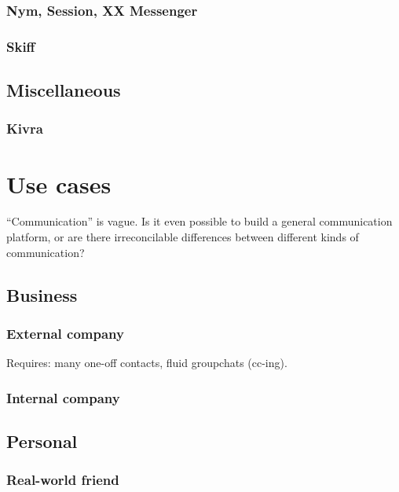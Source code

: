 \documentclass[sigconf, nonacm, balance=false, natbib=false]{acmart}
\begin{document}
\subsubsection{Nym, Session, XX Messenger}

\subsubsection{Skiff}

\subsection{Miscellaneous}

\subsubsection{Kivra}

\section{Use cases}

``Communication'' is vague. Is it even possible to build a general communication platform, or are there irreconcilable differences between different kinds of communication?

\subsection{Business}

\subsubsection{External company}

Requires: many one-off contacts, fluid groupchats (cc-ing).

\subsubsection{Internal company}


\subsection{Personal}

\subsubsection{Real-world friend}
\end{document}
